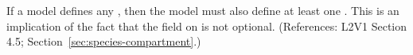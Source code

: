 If a model defines any \Species, then the model must also define at least
one \Compartment.  This is an implication of the fact that the
 field on \Species is not optional.  (References: L2V1
Section 4.5; Section~\ref{sec:species-compartment}.)
